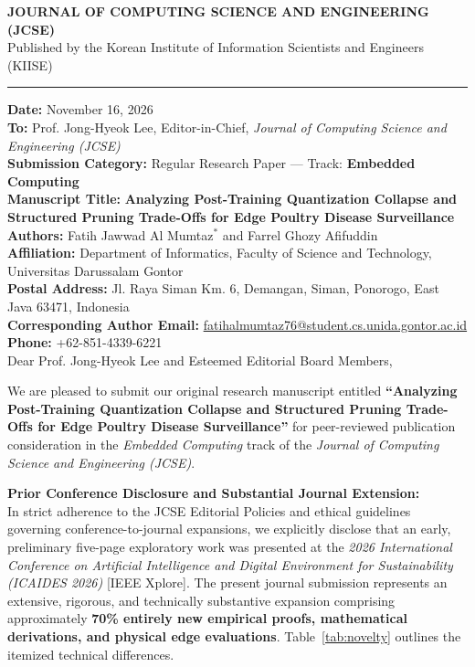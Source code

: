 \documentclass[10pt,a4paper]{article}
\begin{document}
\pagestyle{empty}

\begin{center}
{\Large \textbf{JOURNAL OF COMPUTING SCIENCE AND ENGINEERING (JCSE)}}\\[0.2em]
{\large Published by the Korean Institute of Information Scientists and Engineers (KIISE)}\\[0.15em]
\rule{\linewidth}{0.8pt}
\end{center}

\vspace{0.4em}
\noindent\textbf{Date:} November 16, 2026 \\
\textbf{To:} Prof. Jong-Hyeok Lee, Editor-in-Chief, \textit{Journal of Computing Science and Engineering (JCSE)} \\
\textbf{Submission Category:} Regular Research Paper --- Track: \textbf{Embedded Computing} \\
\textbf{Manuscript Title:} \textbf{Analyzing Post-Training Quantization Collapse and Structured Pruning Trade-Offs for Edge Poultry Disease Surveillance} \\
\textbf{Authors:} Fatih Jawwad Al Mumtaz$^*$ and Farrel Ghozy Afifuddin \\
\textbf{Affiliation:} Department of Informatics, Faculty of Science and Technology, Universitas Darussalam Gontor \\
\textbf{Postal Address:} Jl. Raya Siman Km. 6, Demangan, Siman, Ponorogo, East Java 63471, Indonesia \\
\textbf{Corresponding Author Email:} \url{fatihalmumtaz76@student.cs.unida.gontor.ac.id} \quad \textbf{Phone:} +62-851-4339-6221 \\

\vspace{0.4em}
\noindent Dear Prof. Jong-Hyeok Lee and Esteemed Editorial Board Members,

\vspace{0.3em}
We are pleased to submit our original research manuscript entitled \textbf{``Analyzing Post-Training Quantization Collapse and Structured Pruning Trade-Offs for Edge Poultry Disease Surveillance''} for peer-reviewed publication consideration in the \textit{Embedded Computing} track of the \textit{Journal of Computing Science and Engineering (JCSE)}.

\vspace{0.4em}
\noindent\textbf{Prior Conference Disclosure and Substantial Journal Extension:}\\
In strict adherence to the JCSE Editorial Policies and ethical guidelines governing conference-to-journal expansions, we explicitly disclose that an early, preliminary five-page exploratory work was presented at the \textit{2026 International Conference on Artificial Intelligence and Digital Environment for Sustainability (ICAIDES 2026)} [IEEE Xplore]. The present journal submission represents an extensive, rigorous, and technically substantive expansion comprising approximately \textbf{70\% entirely new empirical proofs, mathematical derivations, and physical edge evaluations}. Table~\ref{tab:novelty} outlines the itemized technical differences.
\end{document}
